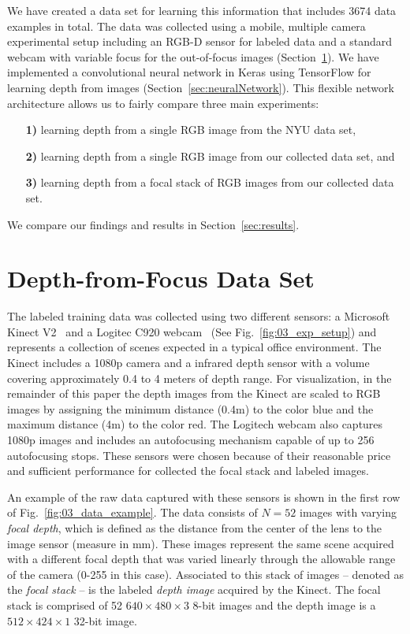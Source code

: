 \documentclass[letterpaper, 10 pt, conference]{ieeeconf}  %
\begin{document}
We have created a data set for learning this information that includes 3674 data examples in total. The data was collected using a mobile, multiple camera experimental setup including an RGB-D sensor for labeled data and a standard webcam with variable focus for the out-of-focus images (Section~\ref{sec:dataSet}).
We have implemented a convolutional neural network in Keras using TensorFlow for learning depth from images (Section~\ref{sec:neuralNetwork}). This flexible network architecture allows us to fairly compare three main experiments:
\begin{itemize}
    \item[\textbf{1)}] learning depth from a single RGB image from the NYU data set, 
    \item[\textbf{2)}] learning depth from a single RGB image from our collected data set, and
    \item[\textbf{3)}] learning depth from a focal stack of RGB images from our collected data set. 
\end{itemize}
We compare our findings and results in Section~\ref{sec:results}.

\section{Depth-from-Focus Data Set}
\label{sec:dataSet}

The labeled training data was collected using two different sensors: a Microsoft Kinect V2~\cite{Kinect} and a Logitec C920 webcam~\cite{Logitech} (See Fig.~\ref{fig:03_exp_setup}) and represents a collection of scenes expected in a typical office environment. 
The Kinect includes a 1080p camera and a infrared depth sensor with a volume covering approximately 0.4 to 4 meters of depth range. For visualization, in the remainder of this paper the depth images from the Kinect are scaled to RGB images by assigning the minimum distance (0.4m) to the color blue and the maximum distance (4m) to the color red. The Logitech webcam also captures 1080p images and includes an autofocusing mechanism capable of up to 256 autofocusing stops. 
These sensors were chosen because of their reasonable price and sufficient performance for collected the focal stack and labeled images. 

An example of the raw data captured with these sensors is shown in the first row of Fig.~\ref{fig:03_data_example}. The data consists of $N=52$ images with varying \textit{focal depth}, which is defined as the distance from the center of the lens to the image sensor (measure in mm). These images represent the same scene acquired with a different focal depth that was varied linearly through the allowable range of the camera (0-255 in this case). Associated to this stack of images -- denoted as the \textit{focal stack} -- is the labeled \textit{depth image} acquired by the Kinect. The focal stack is comprised of 52 $640 \times 480 \times 3$ 8-bit images and the depth image is a $512 \times 424 \times 1$ 32-bit image. 
\end{document}
